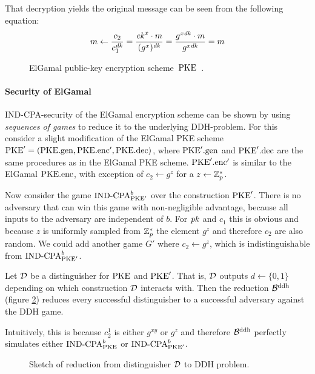 That decryption yields the original message can be seen from the following equation:
\[m\gets\frac{c_2}{c_1^{\mathit{dk}}}=\frac{\mathit{ek}^x\cdot m}{(g^x)^{\mathit{dk}}}=\frac{g^{x\mathit{dk}}\cdot m}{g^{x\mathit{dk}}}=m\]
\begin{figure}[!ht]
    \centering
    \nicoresetlinenr%
    \fbox{%
        \scalebox{\codescalefactor}{%
        }%
    }
    \caption{%
        ElGamal public-key encryption scheme~$\mathrm{PKE}$~\cite{ElGamal85}.
    }
    \label{fig:pke:const:elgamal}
\end{figure}

\paragraph{Security of ElGamal}
IND-CPA-security of the ElGamal encryption scheme can be shown by using \emph{sequences of games} to reduce it to the underlying DDH-problem.
For this consider a slight modification of the ElGamal PKE scheme $\mathrm{PKE}'=(\mathrm{PKE}.\mathrm{gen},\mathrm{PKE}.\mathrm{enc}',\mathrm{PKE}.\mathrm{dec})$, where $\mathrm{PKE}'.\text{gen}$ and $\mathrm{PKE}'.\text{dec}$ are the same procedures as in the ElGamal PKE scheme.
$\mathrm{PKE}'.\text{enc}'$ is similar to the ElGamal $\mathrm{PKE}.\mathrm{enc}$, with exception of $c_2\gets g^z$ for a $z\gets\mathbb{Z}_p^*$.

Now consider the game ${\mathrm{IND}\text{-}\mathrm{CPA}}_{\mathrm{PKE}'}^b$ over the construction $\mathrm{PKE}'$.
There is no adversary that can win this game with non-negligible advantage, because all inputs to the adversary are independent of $b$.
For $\mathit{pk}$ and $c_1$ this is obvious and because $z$ is uniformly sampled from $\mathbb{Z}_p^*$ the element $g^z$ and therefore $c_2$ are also random.
We could add another game $G'$ where $c_2\gets g^z$, which is indistinguishable from ${\mathrm{IND}\text{-}\mathrm{CPA}}_{\mathrm{PKE}'}^b$.

Let $\mathcal{D}$ be a distinguisher for $\mathrm{PKE}$ and $\mathrm{PKE}'$. That is, $\mathcal{D}$ outputs $d\gets\{0,1\}$ depending on which construction $\mathcal{D}$ interacts with.
Then the reduction $\mathcal{B}^{\mathrm{ddh}}$ (figure \ref{fig:elgamal:reduction}) reduces every successful distinguisher to a successful adversary against the DDH game.

Intuitively, this is because $c_2^1$ is either $g^{xy}$ or $g^z$ and therefore $\mathcal{B}^{\mathrm{ddh}}$ perfectly simulates either ${\mathrm{IND}\text{-}\mathrm{CPA}}_{\mathrm{PKE}}^b$ or ${\mathrm{IND}\text{-}\mathrm{CPA}}_{\mathrm{PKE}'}^b$. 
\begin{figure}[!ht]
    \centering
    
    \caption{Sketch of reduction from distinguisher $\mathcal{D}$ to DDH problem.}
    \label{fig:elgamal:reduction}
\end{figure}


